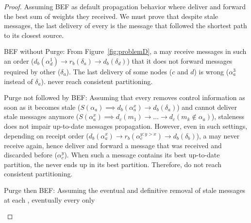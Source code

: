 \begin{proof}
  Assuming BEF as default propagation behavior where \processes
  deliver and forward the best sum of weights they received. We must
  prove that despite stale messages, the last delivery of every
  \process is the message that followed the shortest path to its
  closest source.
  \begin{asparadesc}
  \item [BEF without Purge:] From Figure~\ref{fig:problemD}, a
    \process may receive messages in such an order ($d_b(\alpha_d^1)
    \rightarrow r_b(\delta_a) \rightarrow d_b(\delta_d)$) that it does
    not forward messages required by other \processes
    ($\delta_a$). The last delivery of some nodes ($c$ and $d$) is
    wrong ($\alpha_a^3$ instead of $\delta_a$). \Processes never reach
    consistent partitioning.
  \item [Purge not followed by BEF:]
    Assuming that every \process removes control information as soon
    as it becomes stale ($S(\alpha_a) \implies d_b(\alpha_a^x)
    \rightarrow d_b(\delta_a)$) and cannot deliver stale messages
    anymore ($S(\alpha_a^x) \implies d_c(m_1) \rightarrow \ldots
    \rightarrow d_c(m_k \not\in \alpha_a)$), staleness does not impair
    up-to-date messages propagation. However, even in such settings,
    depending on receipt order ($d_b(\alpha_a^{x}) \rightarrow
    r_b(\alpha_c^{y : y > x}) \rightarrow d_b(\delta_b)$), a \process
    may never receive again, hence deliver and forward a message that
    was received and discarded before ($\alpha_c^{y}$). When such a
    message contains its best up-to-date partition, the \process never
    ends up in its best partition. Therefore, \processes do not reach
    consistent partitioning.
  \item [Purge then BEF:] Assuming the eventual and definitive removal
    of stale messages at each \process, eventually every \process only

\end{asparadesc}
\end{proof}
